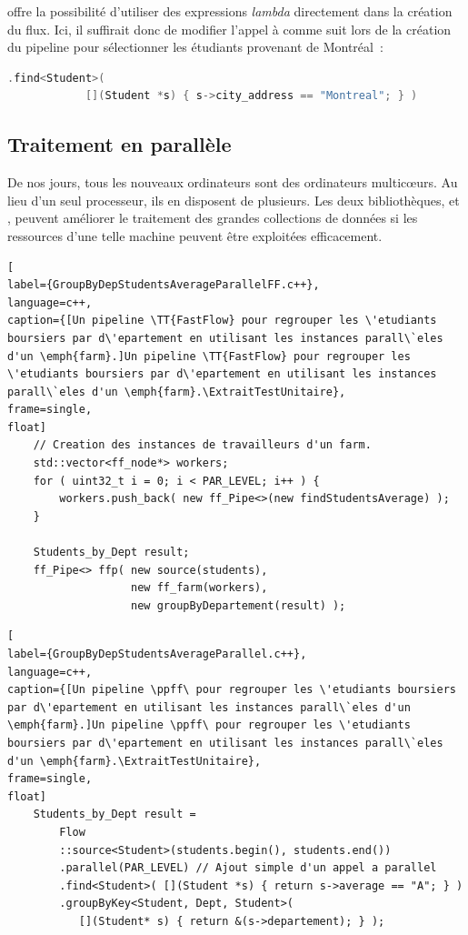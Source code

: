  offre la possibilit\'e d'utiliser des expressions \emph{lambda} directement dans la cr\'eation du flux.
%
Ici, il suffirait donc de modifier l'appel à  comme suit lors de la création du pipeline pour sélectionner les étudiants provenant de Montréal~: 
{
\begin{lstlisting}[language=c++]
		.find<Student>( 
			[](Student *s) { s->city_address == "Montreal"; } )
\end{lstlisting}
}


\subsection*{Traitement en parall\`ele}

De nos jours, tous les nouveaux ordinateurs sont des ordinateurs multicœurs. Au lieu d'un seul processeur, ils en disposent de plusieurs. Les deux biblioth\`eques,  et , peuvent am\'eliorer le traitement des grandes collections de donn\'ees si les ressources d'une telle machine peuvent être exploitées efficacement. 

\begin{lstlisting}[
label={GroupByDepStudentsAverageParallelFF.c++},
language=c++,
caption={[Un pipeline \TT{FastFlow} pour regrouper les \'etudiants boursiers par d\'epartement en utilisant les instances parall\`eles d'un \emph{farm}.]Un pipeline \TT{FastFlow} pour regrouper les \'etudiants boursiers par d\'epartement en utilisant les instances parall\`eles d'un \emph{farm}.\ExtraitTestUnitaire},
frame=single,
float]
	// Creation des instances de travailleurs d'un farm.
	std::vector<ff_node*> workers;
	for ( uint32_t i = 0; i < PAR_LEVEL; i++ ) {
		workers.push_back( new ff_Pipe<>(new findStudentsAverage) );
	}

	Students_by_Dept result;
	ff_Pipe<> ffp( new source(students),
				   new ff_farm(workers),
				   new groupByDepartement(result) );     
\end{lstlisting}

\begin{lstlisting}[
label={GroupByDepStudentsAverageParallel.c++},
language=c++,
caption={[Un pipeline \ppff\ pour regrouper les \'etudiants boursiers par d\'epartement en utilisant les instances parall\`eles d'un \emph{farm}.]Un pipeline \ppff\ pour regrouper les \'etudiants boursiers par d\'epartement en utilisant les instances parall\`eles d'un \emph{farm}.\ExtraitTestUnitaire},
frame=single,
float]
    Students_by_Dept result = 
        Flow
        ::source<Student>(students.begin(), students.end())
        .parallel(PAR_LEVEL) // Ajout simple d'un appel a parallel
        .find<Student>( [](Student *s) { return s->average == "A"; } )
        .groupByKey<Student, Dept, Student>(
           [](Student* s) { return &(s->departement); } );
\end{lstlisting}

